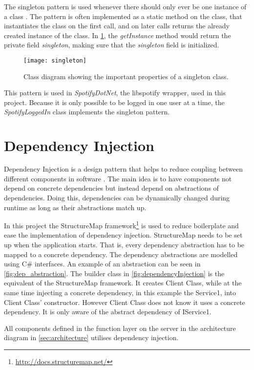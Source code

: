 The singleton pattern is used whenever there should only ever be one
instance of a class \cite{skeet2013c}. The pattern is often implemented as a static
method on the class, that instantiates the class on the first call,
and on later calls returns the already created instance of the class. In
\cref{fig:singleton}, the \textit{getInstance} method would return the private field
\textit{singleton}, making sure that the \textit{singleton} field is initialized.

\begin{figure}[hbtp]
  \centering
  \texttt{[image: singleton]}
  \caption{Class diagram showing the important properties of a
    singleton class.}\label{fig:singleton}
\end{figure}

This pattern is used in \textit{SpotifyDotNet}, the libspotify wrapper, used in
this project. Because it is only possible to be logged in one user at
a time, the \textit{SpotifyLoggedIn} class implements the singleton pattern.

\section{Dependency Injection}

Dependency Injection is a design pattern that helps to reduce coupling
between different components in software \cite{injection}. The main idea is
to have components not depend on concrete dependencies but instead
depend on abstractions of dependencies. Doing this, dependencies can
be dynamically changed during runtime as long as their abstractions
match up.

In this project the StructureMap framework\footnote{\url{http://docs.structuremap.net/}} is used to reduce
boilerplate and ease the implementation of dependency
injection. StructureMap needs to be set up when the application
starts. That is, every dependency abstraction has to be mapped to a
concrete dependency. The dependency abstractions are modelled using
C\# interfaces. An example of an abstraction can be seen in
\cref{fig:dep_abstraction}. The
builder class in \cref{fig:dependencyInjection} is the equivalent of the StructureMap
framework. It creates Client Class, while at the same time injecting a
concrete dependency, in this example the Service1, into Client Class' constructor. However Client
Class does not know it uses a concrete dependency. It is only aware of
the abstract dependency of IService1.

All components defined in the function layer on the server in the
architecture diagram in \cref{sec:architecture} utilises dependency injection.

